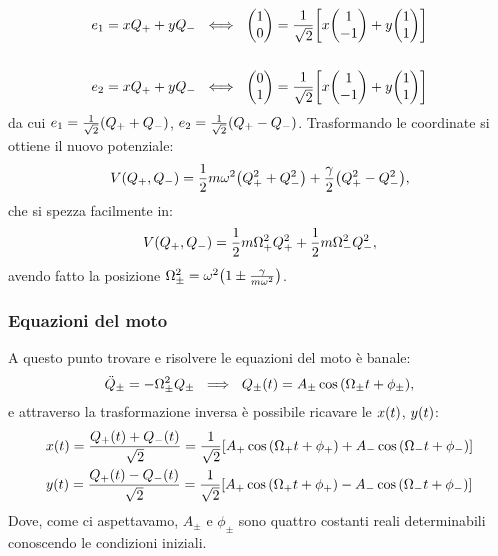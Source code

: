             \begin{align*}
                e_1=xQ_++yQ_-\ & \iff\ \mqty(1 \\ 0)=\frac{1}{\sqrt{2}}\qty[x\mqty(1 \\ -1)+y\mqty(1 \\ 1)] \\\\
                e_2=xQ_++yQ_-\ & \iff\ \mqty(0 \\ 1)=\frac{1}{\sqrt{2}}\qty[x\mqty(1 \\ -1)+y\mqty(1 \\ 1)] 
            \end{align*}
            da cui $e_1=\frac{1}{\sqrt{2}}\qty(Q_++Q_-)$, $e_2=\frac{1}{\sqrt{2}}\qty(Q_+-Q_-)$. Trasformando le coordinate si ottiene il nuovo potenziale: $$V\qty(Q_+,Q_-)=\frac{1}{2}m\omega^2\qty(Q_+^2+Q_-^2)+\frac{\gamma}{2}\qty(Q_+^2-Q_-^2),$$ che si spezza facilmente in: $$V\qty(Q_+,Q_-)=\frac{1}{2}m\Omega_+^2Q_+^2+\frac{1}{2}m\Omega_-^2Q_-^2,$$ avendo fatto la posizione $\Omega_\pm^2=\omega^2\qty(1\pm\frac{\gamma}{m\omega^2})$.
        \subsubsection{Equazioni del moto}
            A questo punto trovare e risolvere le equazioni del moto \`e banale: $$\ddot{Q}_\pm=-\Omega_\pm^2Q_\pm\ \implies\ Q_\pm\qty(t)=A_\pm\cos\qty(\Omega_\pm t+\phi_\pm),$$ e attraverso la trasformazione inversa \`e possibile ricavare le $x\qty(t)$, $y\qty(t)$:
            \begin{align*}
                & x\qty(t)=\frac{Q_+\qty(t)+Q_-\qty(t)}{\sqrt{2}}=\frac{1}{\sqrt{2}}\qty[A_+\cos\qty(\Omega_+t+\phi_+)+A_-\cos\qty(\Omega_-t+\phi_-)] \\
                & y\qty(t)=\frac{Q_+\qty(t)-Q_-\qty(t)}{\sqrt{2}}=\frac{1}{\sqrt{2}}\qty[A_+\cos\qty(\Omega_+t+\phi_+)-A_-\cos\qty(\Omega_-t+\phi_-)]
            \end{align*}
            Dove, come ci aspettavamo, $A_\pm$ e $\phi_\pm$ sono quattro costanti reali determinabili conoscendo le condizioni iniziali.
